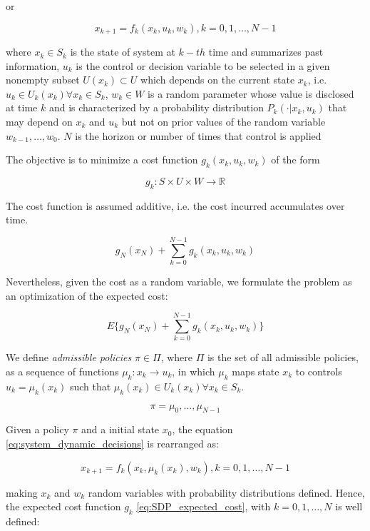  or

\begin{equation}\label{eq:system_dynamic_decisions}
x_{k+1}=f_k(x_k,u_k,w_k), k=0,1,\ldots,N-1 
\end{equation}


where $x_k \in S_k$ is the state of system at $k-th$ time and summarizes past information, $u_k$ is the control or decision variable to be selected in a given nonempty subset $U(x_k) \subset U$ which depends on the current state $x_k$, i.e. $u_k \in U_k(x_k) \forall x_k \in S_k$, $w_k \in W$ is a random parameter whose value is disclosed at time $k$ and is characterized by a probability distribution $P_k(\cdot|x_k,u_k)$ that may depend on $x_k$ and $u_k$ but not on prior values of the random variable $w_{k-1},\ldots,w_0$. $N$ is the horizon or number of times that control is applied

The objective is to minimize a cost function $g_k(x_k,u_k,w_k)$ of the form

\[g_k:S\times U \times W \rightarrow \mathbb{R}\]

The cost function is assumed additive, i.e. the cost incurred accumulates over time.

\[g_N(x_N)+\sum_{k=0}^{N-1}g_k(x_k,u_k,w_k)\]

Nevertheless, given the cost as a random variable, we formulate the problem as an optimization of the expected cost:

\begin{equation}\label{eq:SDP_expected_cost}
 E\biggr\{g_N(x_N)+\sum_{k=0}^{N-1}g_k(x_k,u_k,w_k)\biggr\}
\end{equation}

We define \textit{admissible policies} $\pi \in \Pi$, where $\Pi$ is the set of all admissible policies, as a sequence of functions $\mu_k:x_k\rightarrow u_k$, in which $\mu_k$ maps state $x_k$ to controls $u_k=\mu_k(x_k)$ such that $\mu_k(x_k) \in U_k(x_k) \forall x_k \in S_k$.

\[\pi={\mu_0,\ldots,\mu_{N-1}}\]

Given a policy $\pi$ and a initial state $x_0$, the equation \ref{eq:system_dynamic_decisions} is rearranged as: 

\begin{equation}\label{eq:system_dynamic_policy}
x_{k+1}=f_k(x_k,\mu_k(x_k),w_k), k=0,1,\ldots,N-1 
\end{equation}

making $x_k$ and $w_k$ random variables with probability distributions defined. Hence, the expected cost function $g_k$ \ref{eq:SDP_expected_cost}, with $k=0,1,\ldots,N$ is well defined:

